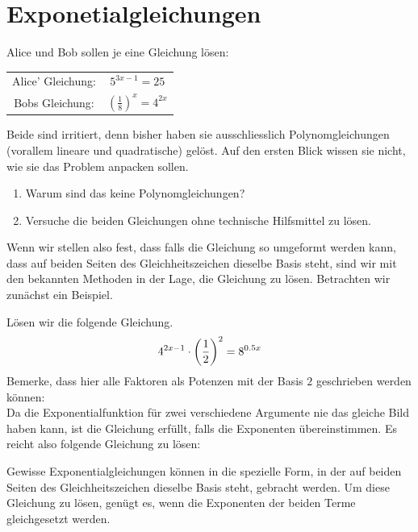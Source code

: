\documentclass[11pt,oneside]{article}
\begin{document}
\newpage
\section{Exponetialgleichungen}
	\begin{aufgabe}
		Alice und Bob sollen je eine Gleichung lösen:
		\begin{table}[H]
			\centering
			\begin{tabular}{c c}
				Alice' Gleichung: & $5^{3x-1}=25$ \\
				Bobs Gleichung: & $\left(\frac{1}{8}\right)^x=4^{2x}$
			\end{tabular}
		\end{table}
		Beide sind irritiert, denn bisher haben sie ausschliesslich Polynomgleichungen (vorallem lineare und quadratische) gelöst. Auf den ersten Blick wissen sie nicht, wie sie das Problem anpacken sollen.
		\begin{enumerate}[label=\alph*)]
			\item Warum sind das keine Polynomgleichungen? \vspace{5pt}\\
			\item Versuche die beiden Gleichungen ohne technische Hilfsmittel zu lösen. \vspace{5pt}\\
		\end{enumerate}
	\end{aufgabe}
	Wenn wir stellen also fest, dass falls die Gleichung so umgeformt werden kann, dass auf beiden Seiten des Gleichheitszeichen dieselbe Basis steht, sind wir mit den bekannten Methoden in der Lage, die Gleichung zu lösen. Betrachten wir zunächst ein Beispiel.
	\begin{beispiel}
		Lösen wir die folgende Gleichung.\[4^{2x-1}\cdot\left(\frac{1}{2}\right)^2=8^{0.5x}\] Bemerke, dass hier alle Faktoren als Potenzen mit der Basis $2$ geschrieben werden können:\vspace{5pt}\\
		Da die Exponentialfunktion für zwei verschiedene Argumente nie das gleiche Bild haben kann, ist die Gleichung erfüllt, falls die Exponenten übereinstimmen. Es reicht also folgende Gleichung zu lösen:\vspace{5pt}\\
	\end{beispiel}
	\begin{satz}[Exponentenvergleich]
		Gewisse Exponentialgleichungen können in die spezielle Form, in der auf beiden Seiten des Gleichheitszeichen dieselbe Basis steht, gebracht werden. Um diese Gleichung zu lösen, genügt es, wenn die Exponenten der beiden Terme gleichgesetzt werden.
	\end{satz}
\end{document}

